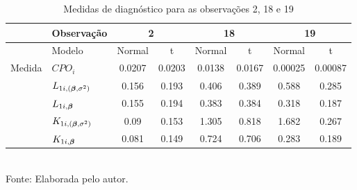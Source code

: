\begin{table}[h]
\centering
\caption{Medidas de diagnóstico para as observações 2, 18 e 19}
\label{tab:chap02_diag}
\begin{tabular}{ll|c|c|c|c|cc}
 & Observação & \multicolumn{2}{c|}{2} & \multicolumn{2}{c|}{18} & \multicolumn{2}{c}{19} \\ \hline %
 & Modelo & Normal & t & Normal & t & \multicolumn{1}{c|}{Normal} & t \\ \hline
Medida & $CPO_i$ & 0.0207 & 0.0203 & 0.0138 & 0.0167 & \multicolumn{1}{c|}{0.00025} & 0.00087 \\
 & $L_{1i,({\boldsymbol{\beta}},\sigma^2)}$ & 0.156 & 0.193 & 0.406 & 0.389 & \multicolumn{1}{c|}{0.588} & 0.285 \\
 & $L_{1i,{\boldsymbol{\beta}}}$ & 0.155 & 0.194 & 0.383 & 0.384 & \multicolumn{1}{c|}{0.318} & 0.187 \\
 & $K_{1i,({\boldsymbol{\beta}},\sigma^2)}$ & 0.09 & 0.153 & 1.305 & 0.818 & \multicolumn{1}{c|}{1.682} & 0.267 \\
 & $K_{1i,{\boldsymbol{\beta}}}$ & 0.081 & 0.149 & 0.724 & 0.706 & \multicolumn{1}{c|}{0.283} & 0.189 \\ \hline
\end{tabular}
\\ Fonte: Elaborada pelo autor.
\end{table}
